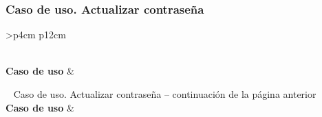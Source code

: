 \subsubsection{Caso de uso. Actualizar contraseña} \label{sec:cu_actualizar-contrasena}
\begin{longtable}{
    >{}p{4cm}
    p{12cm}
    }
    \caption{Caso de uso. Actualizar contraseña} \label{table:cu_actualizar-contrasena} \\
    \toprule
    \textbf{Caso de uso} &  \\
    \endfirsthead
    
    {{ \tablename\ \thetable{} Caso de uso. Actualizar contraseña -- continuación de la página anterior}} \\
    \toprule
    \textbf{Caso de uso} &  \\
    \midrule
    \endhead
    
    \midrule
     \\ 
    \endfoot
    
    \bottomrule
    \endlastfoot
    

\end{longtable}

